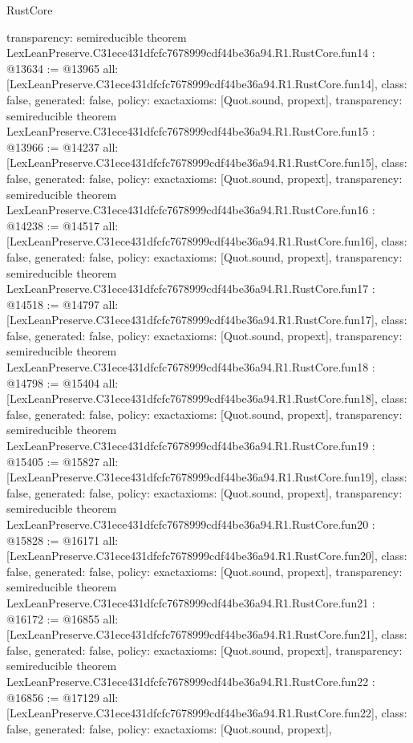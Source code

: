 \begin{lexlean}{RustCore}
\begin{coremodule}
{  transparency: semireducible
}
theorem LexLeanPreserve.C31ece431dfcfc7678999cdf44be36a94.R1.RustCore.fun14 : @13634 := @13965 {
  all: [LexLeanPreserve.C31ece431dfcfc7678999cdf44be36a94.R1.RustCore.fun14],
  class: false,
  generated: false,
  policy: exact{axioms: [Quot.sound, propext]},
  transparency: semireducible
}
theorem LexLeanPreserve.C31ece431dfcfc7678999cdf44be36a94.R1.RustCore.fun15 : @13966 := @14237 {
  all: [LexLeanPreserve.C31ece431dfcfc7678999cdf44be36a94.R1.RustCore.fun15],
  class: false,
  generated: false,
  policy: exact{axioms: [Quot.sound, propext]},
  transparency: semireducible
}
theorem LexLeanPreserve.C31ece431dfcfc7678999cdf44be36a94.R1.RustCore.fun16 : @14238 := @14517 {
  all: [LexLeanPreserve.C31ece431dfcfc7678999cdf44be36a94.R1.RustCore.fun16],
  class: false,
  generated: false,
  policy: exact{axioms: [Quot.sound, propext]},
  transparency: semireducible
}
theorem LexLeanPreserve.C31ece431dfcfc7678999cdf44be36a94.R1.RustCore.fun17 : @14518 := @14797 {
  all: [LexLeanPreserve.C31ece431dfcfc7678999cdf44be36a94.R1.RustCore.fun17],
  class: false,
  generated: false,
  policy: exact{axioms: [Quot.sound, propext]},
  transparency: semireducible
}
theorem LexLeanPreserve.C31ece431dfcfc7678999cdf44be36a94.R1.RustCore.fun18 : @14798 := @15404 {
  all: [LexLeanPreserve.C31ece431dfcfc7678999cdf44be36a94.R1.RustCore.fun18],
  class: false,
  generated: false,
  policy: exact{axioms: [Quot.sound, propext]},
  transparency: semireducible
}
theorem LexLeanPreserve.C31ece431dfcfc7678999cdf44be36a94.R1.RustCore.fun19 : @15405 := @15827 {
  all: [LexLeanPreserve.C31ece431dfcfc7678999cdf44be36a94.R1.RustCore.fun19],
  class: false,
  generated: false,
  policy: exact{axioms: [Quot.sound, propext]},
  transparency: semireducible
}
theorem LexLeanPreserve.C31ece431dfcfc7678999cdf44be36a94.R1.RustCore.fun20 : @15828 := @16171 {
  all: [LexLeanPreserve.C31ece431dfcfc7678999cdf44be36a94.R1.RustCore.fun20],
  class: false,
  generated: false,
  policy: exact{axioms: [Quot.sound, propext]},
  transparency: semireducible
}
theorem LexLeanPreserve.C31ece431dfcfc7678999cdf44be36a94.R1.RustCore.fun21 : @16172 := @16855 {
  all: [LexLeanPreserve.C31ece431dfcfc7678999cdf44be36a94.R1.RustCore.fun21],
  class: false,
  generated: false,
  policy: exact{axioms: [Quot.sound, propext]},
  transparency: semireducible
}
theorem LexLeanPreserve.C31ece431dfcfc7678999cdf44be36a94.R1.RustCore.fun22 : @16856 := @17129 {
  all: [LexLeanPreserve.C31ece431dfcfc7678999cdf44be36a94.R1.RustCore.fun22],
  class: false,
  generated: false,
  policy: exact{axioms: [Quot.sound, propext]},
}
\end{coremodule}
\end{lexlean}
